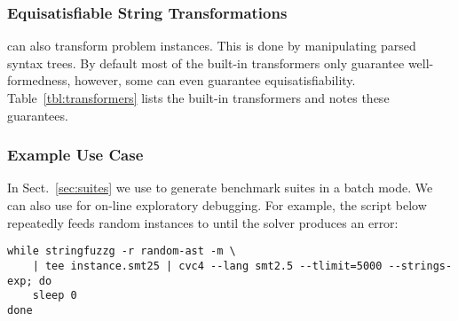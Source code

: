 \subsubsection{Equisatisfiable String Transformations}
\fuzzer{} can also transform problem instances.
This is done by manipulating parsed syntax trees.
By default most of the built-in transformers
only guarantee well-formedness, however,
some can even guarantee equisatisfiability. Table~\ref{tbl:transformers}
lists the built-in transformers and notes these guarantees.

\subsubsection{Example Use Case}
In Sect.~\ref{sec:suites} we use \fuzzer{} to generate benchmark suites in a batch mode.
We can also use \fuzzer{} for on-line exploratory debugging.
For example, the script below repeatedly feeds random \fuzzer{}
instances to \cvc{} until the solver produces an error:
{\scriptsize\begin{verbatim}
while stringfuzzg -r random-ast -m \
    | tee instance.smt25 | cvc4 --lang smt2.5 --tlimit=5000 --strings-exp; do
    sleep 0
done\end{verbatim}}
